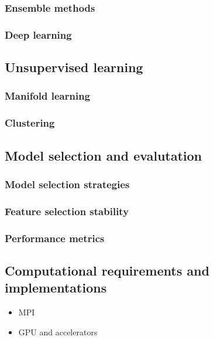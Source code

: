     \subsubsection{Ensemble methods}
    \subsubsection{Deep learning}


  \subsection{Unsupervised learning} \label{subsec:unsupervised_learning}
    \subsubsection{Manifold learning}
    \subsubsection{Clustering}


  \subsection{Model selection and evalutation} \label{subsec:model_selection}
    \subsubsection{Model selection strategies}
    \subsubsection{Feature selection stability}
    \subsubsection{Performance metrics}


  \subsection{Computational requirements and implementations} \label{subsec:implementation}
    \begin{itemize}
      \item MPI
      \item GPU and accelerators
    \end{itemize}
